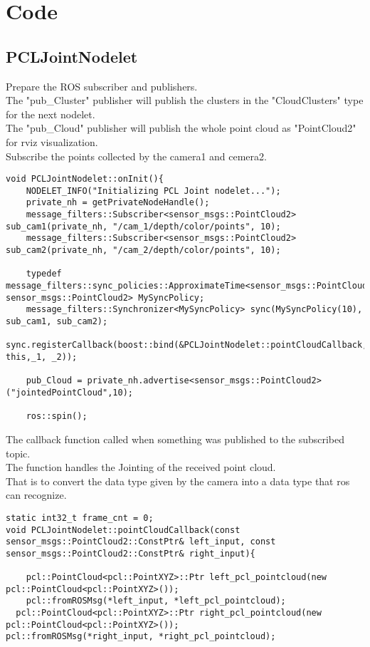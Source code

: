 \chapter{Code}
\section{PCLJointNodelet}
 Prepare the ROS subscriber and publishers.\\	
 The "pub\_Cluster" publisher will publish the clusters in the "CloudClusters" type for the next nodelet.\\
 The "pub\_Cloud" publisher will publish the whole point cloud as "PointCloud2" for rviz visualization.\\
 Subscribe the points collected by the camera1 and cemera2.
 
\begin{lstlisting}[caption={}]
void PCLJointNodelet::onInit(){
	NODELET_INFO("Initializing PCL Joint nodelet...");
	private_nh = getPrivateNodeHandle();
	message_filters::Subscriber<sensor_msgs::PointCloud2> sub_cam1(private_nh, "/cam_1/depth/color/points", 10);
	message_filters::Subscriber<sensor_msgs::PointCloud2> sub_cam2(private_nh, "/cam_2/depth/color/points", 10);
	
	typedef message_filters::sync_policies::ApproximateTime<sensor_msgs::PointCloud2, sensor_msgs::PointCloud2> MySyncPolicy;
	message_filters::Synchronizer<MySyncPolicy> sync(MySyncPolicy(10), sub_cam1, sub_cam2);
	sync.registerCallback(boost::bind(&PCLJointNodelet::pointCloudCallback, this,_1, _2));
	
	pub_Cloud = private_nh.advertise<sensor_msgs::PointCloud2>("jointedPointCloud",10);
	
	ros::spin();
\end{lstlisting}

 The callback function called when something was published to the subscribed topic.\\
 The function handles the Jointing of the received point cloud.\\
 That is to convert the data type given by the camera into a data type that ros can recognize.
\begin{lstlisting}[caption={}]
static int32_t frame_cnt = 0;
void PCLJointNodelet::pointCloudCallback(const sensor_msgs::PointCloud2::ConstPtr& left_input, const sensor_msgs::PointCloud2::ConstPtr& right_input){
	
	pcl::PointCloud<pcl::PointXYZ>::Ptr left_pcl_pointcloud(new pcl::PointCloud<pcl::PointXYZ>());
	pcl::fromROSMsg(*left_input, *left_pcl_pointcloud);
  pcl::PointCloud<pcl::PointXYZ>::Ptr right_pcl_pointcloud(new pcl::PointCloud<pcl::PointXYZ>());
pcl::fromROSMsg(*right_input, *right_pcl_pointcloud);
\end{lstlisting}

